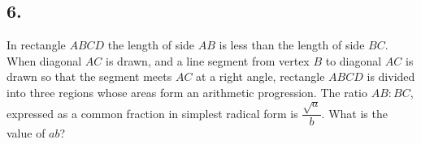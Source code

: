 \documentclass[12pt]{article}
\begin{document}
\begin{answer}
%
\end{answer}



\subsection*{6.}
In rectangle $ABCD$ the length of side $AB$ is less than the length of side $BC$. When diagonal $AC$ is drawn, and a line segment from vertex $B$ to diagonal $AC$ is drawn so that the segment meets $AC$ at a right angle, rectangle $ABCD$ is divided into three regions whose areas form an arithmetic progression. The ratio $AB{:}BC$, expressed as a common fraction in simplest radical form is $\dfrac{\sqrt{a}}{b}$. What is the value of $ab$? 

\nopagebreak

\fbox{\phantom{ANSWER}}
\end{document}
